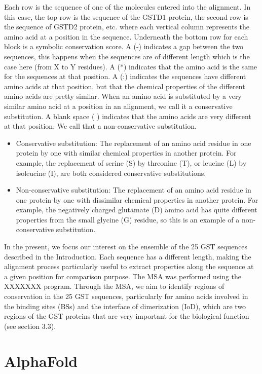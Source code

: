 Each row is the sequence of one of the molecules entered into the alignment. In this case, the top row is the sequence of the GSTD1 protein, the second row is the sequence of GSTD2 protein, etc. where each vertical column represents the amino acid at a position in the sequence. Underneath the bottom row for each block is a symbolic conservation score. A (-) indicates a gap between the two sequences, this happens when the sequences are of different length which is the case here (from X to Y residues). A (*) indicates that the amino acid is the same for the sequences at that position. A (:) indicates the sequences have different amino acids at that position, but that the chemical properties of the different amino acids are pretty similar. When an amino acid is substituted by a very similar amino acid at a position in an alignment, we call it a conservative substitution. A blank space ( ) indicates that the amino acids are very different at that position. We call that a non-conservative substitution.
\begin{itemize}
	\item Conservative substitution: The replacement of an amino acid residue in one protein by one with similar chemical properties in another protein. For example, the replacement of serine (S) by threonine (T), or leucine (L) by isoleucine (I), are both considered conservative substitutions.
	\item Non-conservative substitution: The replacement of an amino acid residue in one protein by one with dissimilar chemical properties in another protein. For example, the negatively charged glutamate (D) amino acid has quite different properties from the small glycine (G) residue, so this is an example of a non-conservative substitution.
\end{itemize}

In the present, we focus our interest on the ensemble of the 25 GST sequences described in the Introduction. Each sequence has a different length, making the alignment process particularly useful to extract properties along the sequence at a given position for comparison purpose. The MSA was performed using the XXXXXXX program. Through the MSA, we aim to identify regions of conservation in the 25 GST sequences, particularly for amino acids involved in the binding sites (BSs) and the interface of dimerization (IoD), which are two regions of the GST proteins that are very important for the biological function (see section 3.3). 

\section{AlphaFold}

